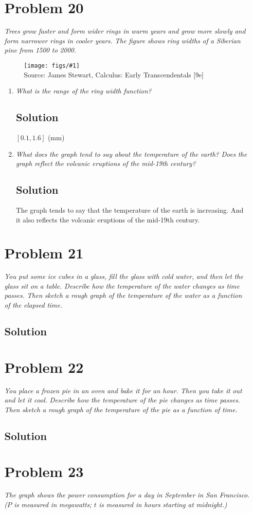 \documentclass[11pt]{article}
\newcommand{\soln}{\subsection*}
\newcommand{\qn}{\textit}
\newcommand{\imagesource}[1]{{\footnotesize Source: #1}}
\newcommand{\img}[1]{
	\begin{figure}[h]
		\centering
		\texttt{[image: figs/\#1]}\\
		\imagesource{James Stewart, Calculus: Early Transcendentals [9e]}
	\end{figure}
}
\begin{document}
\section*{Problem 20}

\qn{Trees grow faster and form wider rings in warm years and grow more slowly and form narrower rings in cooler years. The figure shows ring widths of a Siberian pine from 1500 to 2000.}

\img{1.1.20}

\begin{enumerate}
	\item \qn{What is the range of the ring width function?}
	\soln{Solution}
	$[0.1, 1.6]$ (mm)
	
	\item \qn{What does the graph tend to say about the temperature of the earth? Does the graph reflect the volcanic eruptions of the mid-19th century?}
	\soln{Solution}
	The graph tends to say that the temperature of the earth is increasing. And it also reflects the volcanic eruptions of the mid-19th century.
\end{enumerate}

\section*{Problem 21}

\qn{You put some ice cubes in a glass, fill the glass with cold water, and then let the glass sit on a table. Describe how the temperature of the water changes as time passes. Then sketch a rough graph of the temperature of the water as a function of the elapsed time.}

\soln{Solution}

\section*{Problem 22}

\qn{You place a frozen pie in an oven and bake it for an hour. Then you take it out and let it cool. Describe how the temperature of the pie changes as time passes. Then sketch a rough graph of the temperature of the pie as a function of time.}

\soln{Solution}

\section*{Problem 23}

\qn{The graph shows the power consumption for a day in September in San Francisco. ($P$ is measured in megawatts; $t$ is measured in hours starting at midnight.)}
\end{document}
